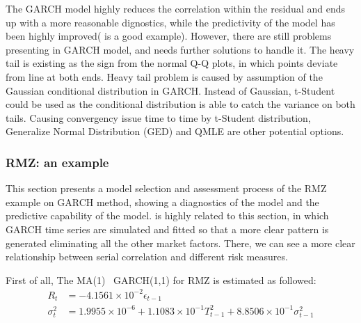 \documentclass[11pt]{article}
\begin{document}
The GARCH model highly reduces the correlation within the residual and ends up with a more reasonable dignostics, while the predictivity of the model has  been highly improved( 
is a good example). However, there are still problems presenting in GARCH model, and needs further solutions to handle it. The heavy tail is existing as the sign from the normal Q-Q plots, in which points deviate from line at both ends. Heavy tail problem is caused by assumption of the Gaussian conditional distribution in GARCH. Instead of Gaussian, t-Student could be used as the conditional distribution is able to catch the variance on both tails. Causing convergency issue time to time by t-Student distribution, Generalize Normal Distribution (GED) and  QMLE are other potential options.
 
\subsubsection{RMZ: an example}
This section presents a model selection and assessment process of the RMZ example on GARCH method, showing a diagnostics of the model and the predictive capability of the model.
is highly related to this section, in which GARCH time series are simulated and fitted so that a more clear pattern is generated eliminating all the other market factors. There, we can see a more clear relationship between serial correlation and different risk measures.

First of all, The MA(1)~ GARCH(1,1) for RMZ is estimated as followed:
\begin{align*}
R_t &= -4.1561\times 10^{-2}\epsilon_{t-1} \\
\sigma_t^2 & = 1.9955 \times 10^{-6} +1.1083\times 10^{-1} T_{t-1}^2 +8.8506\times 10^{-1}  \sigma_{t-1}^2
\end{align*}
\end{document}
